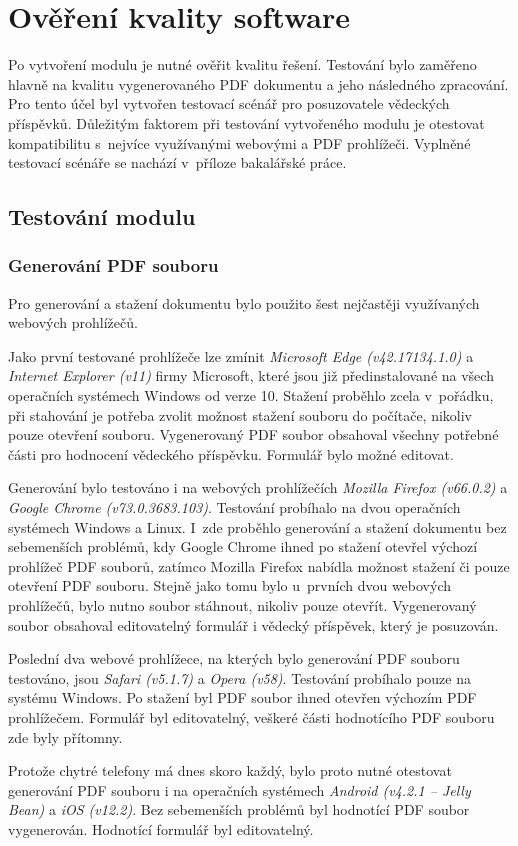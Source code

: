 \chapter{Ověření kvality software}
Po vytvoření modulu je nutné ověřit kvalitu řešení. Testování bylo zaměřeno hlavně na kvalitu vygenerovaného PDF dokumentu a jeho následného zpracování. Pro tento účel byl vytvořen testovací scénář pro posuzovatele vědeckých příspěvků. Důležitým faktorem při testování vytvořeného modulu je otestovat kompatibilitu s~nejvíce využívanými webovými a PDF prohlížeči. Vyplněné testovací scénáře se nachází v~příloze bakalářské práce.

\section{Testování modulu}

\subsection{Generování PDF souboru}
Pro generování a stažení dokumentu bylo použito šest nejčastěji využívaných webových prohlížečů.
\par
Jako první testované prohlížeče lze zmínit \textit{Microsoft Edge (v42.17134.1.0)} a \textit{Internet Explorer (v11)} firmy Microsoft, které jsou již předinstalované na všech operačních systémech Windows od verze 10. Stažení proběhlo zcela v~pořádku, při stahování je potřeba zvolit možnost stažení souboru do počítače, nikoliv pouze otevření souboru. Vygenerovaný PDF soubor obsahoval všechny potřebné části pro hodnocení vědeckého příspěvku. Formulář bylo možné editovat.
\par
Generování bylo testováno i na webových prohlížečích \textit{Mozilla Firefox (v66.0.2)} a \textit{Google Chrome (v73.0.3683.103)}. Testování probíhalo na dvou operačních systémech Windows a Linux. I~zde proběhlo generování a stažení dokumentu bez sebemenších problémů, kdy Google Chrome ihned po stažení otevřel výchozí prohlížeč PDF souborů, zatímco Mozilla Firefox nabídla možnost stažení či pouze otevření PDF souboru. Stejně jako tomu bylo u~prvních dvou webových prohlížečů, bylo nutno soubor stáhnout, nikoliv pouze otevřít. Vygenerovaný soubor obsahoval editovatelný formulář i vědecký příspěvek, který je posuzován.
\par
Poslední dva webové prohlížece, na kterých bylo generování PDF souboru testováno, jsou \textit{Safari (v5.1.7)} a \textit{Opera (v58)}. Testování probíhalo pouze na systému Windows. Po stažení byl PDF soubor ihned otevřen výchozím PDF prohlížečem. Formulář byl editovatelný, veškeré části hodnotícího PDF souboru zde byly přítomny.
\par
Protože chytré telefony má dnes skoro každý, bylo proto nutné otestovat generování PDF souboru i na operačních systémech \textit{Android (v4.2.1 -- Jelly Bean)} a \textit{iOS (v12.2)}. Bez sebemenších problémů byl hodnotící PDF soubor vygenerován. Hodnotící formulář byl editovatelný.


